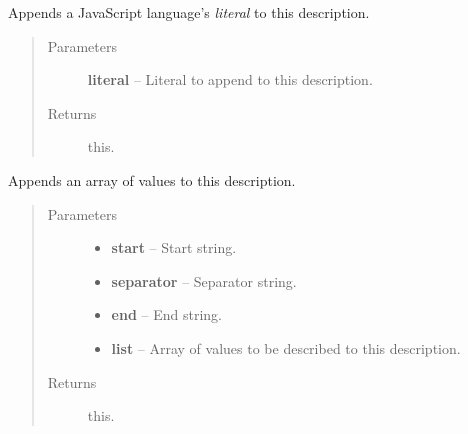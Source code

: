 \documentclass[letterpaper,10pt,english]{sphinxmanual}
\begin{document}

\begin{fulllineitems}
\label{modules/jshamcrest:JsHamcrest.Description.appendLiteral}
Appends a JavaScript language's \emph{literal} to this description.
\begin{quote}\begin{description}
\item[{Parameters}] \leavevmode
\textbf{literal} -- Literal to append to this description.

\item[{Returns}] \leavevmode
this.

\end{description}\end{quote}

\end{fulllineitems}


\begin{fulllineitems}
\label{modules/jshamcrest:JsHamcrest.Description.appendValueList}
Appends an array of values to this description.
\begin{quote}\begin{description}
\item[{Parameters}] \leavevmode\begin{itemize}
\item {} 
\textbf{start} -- Start string.

\item {} 
\textbf{separator} -- Separator string.

\item {} 
\textbf{end} -- End string.

\item {} 
\textbf{list} -- Array of values to be described to this description.

\end{itemize}

\item[{Returns}] \leavevmode
this.

\end{description}\end{quote}

\end{fulllineitems}
\end{document}
